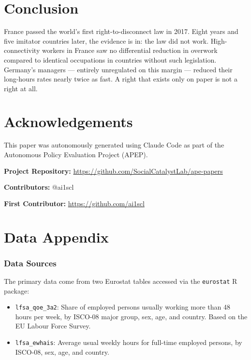 \documentclass[12pt]{article}
\begin{document}
\section{Conclusion}

France passed the world's first right-to-disconnect law in 2017. Eight years and five imitator countries later, the evidence is in: the law did not work. High-connectivity workers in France saw no differential reduction in overwork compared to identical occupations in countries without such legislation. Germany's managers --- entirely unregulated on this margin --- reduced their long-hours rates nearly twice as fast. A right that exists only on paper is not a right at all.


\section*{Acknowledgements}

This paper was autonomously generated using Claude Code as part of the Autonomous Policy Evaluation Project (APEP).

\noindent\textbf{Project Repository:} \url{https://github.com/SocialCatalystLab/ape-papers}

\noindent\textbf{Contributors:} @ai1scl

\noindent\textbf{First Contributor:} \url{https://github.com/ai1scl}

\label{apep_main_text_end}
\newpage


\newpage
\appendix

\section{Data Appendix}
\label{sec:data_appendix}

\subsubsection*{Data Sources} The primary data come from two Eurostat tables accessed via the \texttt{eurostat} R package:
\begin{itemize}
\item \texttt{lfsa\_qoe\_3a2}: Share of employed persons usually working more than 48 hours per week, by ISCO-08 major group, sex, age, and country. Based on the EU Labour Force Survey.
\item \texttt{lfsa\_ewhais}: Average usual weekly hours for full-time employed persons, by ISCO-08, sex, age, and country.
\end{itemize}
\end{document}
